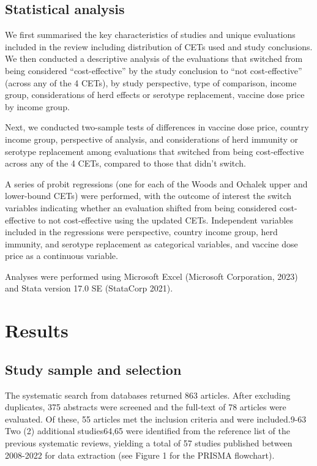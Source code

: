 \documentclass[12pt]{article}
\begin{document}
\subsection*{Statistical analysis}
We first summarised the key characteristics of studies and unique evaluations included in the review including distribution of CETs used and study conclusions. We then conducted a descriptive analysis of the evaluations that switched from being considered “cost-effective” by the study conclusion to “not cost-effective” (across any of the 4 CETs), by study perspective, type of comparison, income group, considerations of herd effects or serotype replacement, vaccine dose price by income group.

Next, we conducted two-sample tests of differences in vaccine dose price, country income group, perspective of analysis, and considerations of herd immunity  or serotype replacement among evaluations that switched from being cost-effective across any of the 4 CETs, compared to those that didn’t switch.

A series of probit regressions (one for each of the Woods and Ochalek upper and lower-bound CETs) were performed, with the outcome of interest the switch variables indicating whether an evaluation shifted from being considered cost-effective to not cost-effective using the updated CETs. Independent variables included in the regressions were perspective, country income group, herd immunity, and serotype replacement as categorical variables, and vaccine dose price as a continuous variable.

Analyses were performed using Microsoft Excel (Microsoft Corporation, 2023) and Stata version 17.0 SE (StataCorp 2021). 


\section*{Results}
\subsection*{Study sample and selection}
The systematic search from databases returned 863 articles. After excluding duplicates, 375 abstracts were screened and the full-text of 78 articles were evaluated. Of these, 55 articles met the inclusion criteria and were included.9-63 Two (2) additional studies64,65 were identified from the reference list of the previous systematic reviews, yielding a total of 57 studies published between 2008-2022 for data extraction (see  Figure 1 for the PRISMA flowchart). 
\end{document}
